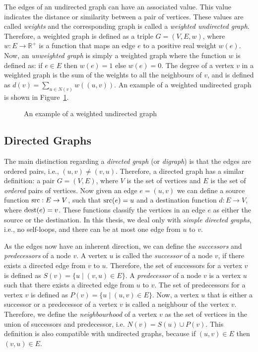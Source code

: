 The edges of an undirected graph can have an associated value.
This value indicates the distance or similarity between a pair of vertices.
These values are called \textit{weights} and the corresponding graph is called a \textit{weighted undirected graph}.
Therefore, a weighted graph is defined as a triple $G=(V,E,w)$, where $w:E \rightarrow \mathbb{R}^{+}$ is a function that maps an edge $e$ to a positive real weight $w(e)$.
Now, an \textit{unweighted graph} is simply a weighted graph where the function $w$ is defined as: if $e \in E$ then $w(e)=1$ else $w(e)=0$.
The degree of a vertex $v$ in a weighted graph is the sum of the weights to all the neighbours of $v$, and is defined as $d(v) = \sum_{u\in N(v)}w((u,v))$.
An example of a weighted undirected graph is shown in Figure~\ref{fig:weighted-undirected}. 
\begin{figure}[!ht]
    \centering
    
    \caption{An example of a weighted undirected graph}
    \label{fig:weighted-undirected}
\end{figure}


\subsection{Directed Graphs}
The main distinction regarding a \textit{directed graph} (or \textit{digraph}) is that the edges are ordered pairs, i.e., $(u,v) \neq (v,u)$.
Therefore, a directed graph has a similar definition: a pair $G=(V,E)$, where $V$ is the set of vertices and $E$ is the set of \textit{ordered} pairs of vertices.
Now given an edge $e=(u,v)$ we can define a source function $\operatorname*{src}:E\rightarrow V$, such that $\operatorname*{src}(e)=u$ and a destination function $d:E\rightarrow V$, where $\operatorname*{dest}(e)=v$.
These functions classify the vertices in an edge $e$ as either the source or the destination.
In this thesis, we deal only with \textit{simple directed graphs}, i.e., no self-loops, and there can be at most one edge from $u$ to $v$. 

As the edges now have an inherent direction, we can define the \textit{successors} and \textit{predecessors} of a node $v$.
A vertex $u$ is called the \textit{successor} of a node $v$, if there exists a directed edge from $v$ to $u$.
Therefore, the set of successors for a vertex $v$ is defined as $S(v) = \{u \mid (v,u) \in E\}$.
A \textit{predecessor} of a node $v$ is a vertex $u$ such that there exists a directed edge from $u$ to $v$.
The set of predecessors for a vertex $v$ is defined as $P(v) = \{u \mid (u,v) \in E\}$.
Now, a vertex $u$ that is either a successor or a predecessor of a vertex $v$ is called a neighbour of the vertex $v$.
Therefore, we define the \textit{neighbourhood} of a vertex $v$ as the set of vertices in the union of successors and predecessor, i.e. $N(v) = S(u) \cup P(v)$.
This definition is also compatible with undirected graphs, because if $(u,v) \in E$ then $(v,u) \in E$. 

